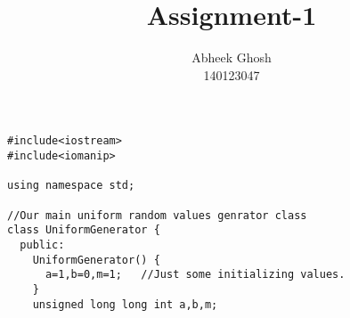 \documentclass{article}
\begin{document}
	\title{\textbf{Assignment-1}}
	\author{Abheek Ghosh \\ 
		140123047 }
	
	\maketitle
	

\begin{lstlisting}
#include<iostream>
#include<iomanip>

using namespace std;

//Our main uniform random values genrator class
class UniformGenerator {
  public:
    UniformGenerator() {
      a=1,b=0,m=1;   //Just some initializing values.
    }
    unsigned long long int a,b,m;


\end{lstlisting}
\end{document}
